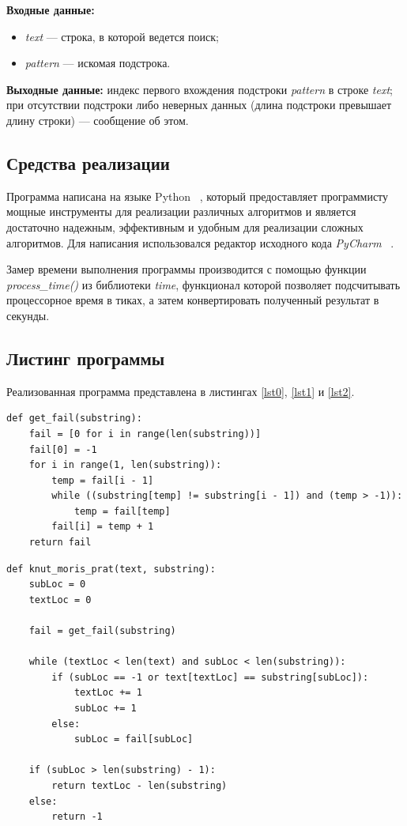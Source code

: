 \documentclass[a4paper,12pt]{article}
\begin{document}
\begin{flushleft}
	\textbf{Входные данные:} 
	\begin{itemize}
		\item \textit{text} --- строка, в которой ведется поиск;
		\item \textit{pattern} --- искомая подстрока.
	\end{itemize}
	
	\textbf{Выходные данные:} индекс первого вхождения
	подстроки \textit{pattern} в строке
	\textit{text}; при отсутствии подстроки либо неверных данных
	(длина подстроки превышает длину строки) --- сообщение об этом.
\end{flushleft}

\subsection{Средства реализации}

Программа написана на языке Python ~\cite{python}, который 
предоставляет программисту мощные инструменты для реализации различных алгоритмов и является достаточно 
надежным, эффективным и удобным для реализации сложных алгоритмов. Для написания использовался 
редактор исходного кода \textit{PyCharm} ~\cite{pycharm}.

Замер времени выполнения программы 
производится с помощью функции \textit{process\_time()} из библиотеки \textit{time},
функционал которой позволяет подсчитывать процессорное время в тиках,
а затем конвертировать полученный результат в секунды.

\subsection{Листинг программы}

Реализованная программа представлена
в листингах \ref{lst0}, \ref{lst1} и \ref{lst2}.

\begin{lstlisting}[label=lst0,caption=Реализация
заполнения массива сдвигов]
def get_fail(substring):
	fail = [0 for i in range(len(substring))]
	fail[0] = -1
	for i in range(1, len(substring)):
		temp = fail[i - 1]
		while ((substring[temp] != substring[i - 1]) and (temp > -1)):
			temp = fail[temp]
		fail[i] = temp + 1
	return fail
\end{lstlisting}

\begin{lstlisting}[label=lst1,caption=Реализация
алгоритма Кнута-Морриса-Пратта]
def knut_moris_prat(text, substring):
	subLoc = 0
	textLoc = 0
	
	fail = get_fail(substring)
	
	while (textLoc < len(text) and subLoc < len(substring)):
		if (subLoc == -1 or text[textLoc] == substring[subLoc]):
			textLoc += 1
			subLoc += 1
		else:
			subLoc = fail[subLoc]
	
	if (subLoc > len(substring) - 1):
		return textLoc - len(substring)
	else:
		return -1
\end{lstlisting}
\end{document}
